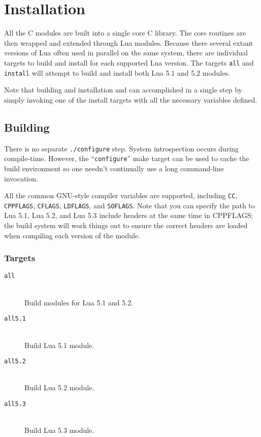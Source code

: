\documentclass[11pt, oneside]{memoir}
\begin{document}
\chapter{Installation}

All the C modules are built into a single core C library. The core routines are then wrapped and extended through Lua modules. Because there several extant versions of Lua often used in parallel on the same system, there are individual targets to build and install for each supported Lua version. The targets \texttt{all} and \texttt{install} will attempt to build and install both Lua 5.1 and 5.2 modules.

Note that building and installation and can accomplished in a single step by simply invoking one of the install targets with all the necessary variables defined.

\section{Building}

There is no separate \texttt{./configure} step. System introspection occurs during compile-time. However, the ``\texttt{configure}'' make target can be used to cache the build environment so one needn't continually use a long command-line invocation.

All the common GNU-style compiler variables are supported, including \texttt{CC}, \texttt{CPPFLAGS}, \texttt{CFLAGS}, \texttt{LDFLAGS}, and \texttt{SOFLAGS}. Note that you can specify the path to Lua 5.1, Lua 5.2, and Lua 5.3 include headers at the same time in CPPFLAGS; the build system will work things out to ensure the correct headers are loaded when compiling each version of the module.

\subsection{Targets}

\begin{description}
\item[\texttt{all}] \hfill \\
Build modules for Lua 5.1 and 5.2.

\item[\texttt{all5.1}] \hfill \\
Build Lua 5.1 module.

\item[\texttt{all5.2}] \hfill \\
Build Lua 5.2 module.

\item[\texttt{all5.3}] \hfill \\
Build Lua 5.3 module.

\end{description}
\end{document}
